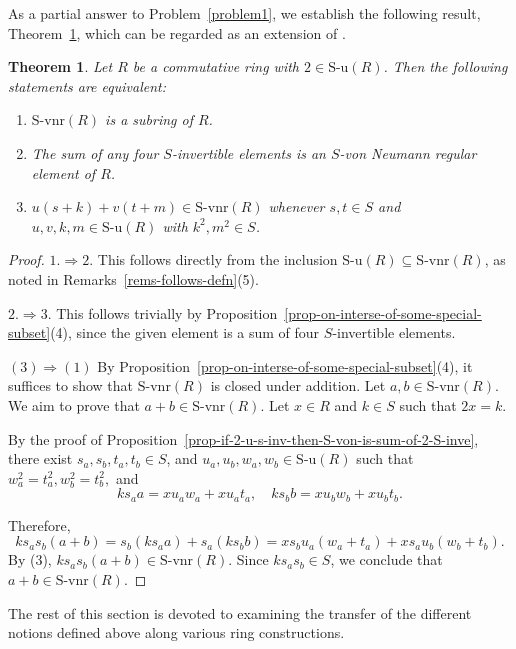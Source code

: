 \documentclass[12pt]{article}
\newtheorem{thm}{\bf Theorem}[section]
\def\Su{\mathrm{S\text{-}u}}
\def\Svnr{\mathrm{S\text{-}vnr}}
\begin{document}
 As a partial answer to Problem~\ref{problem1}, we establish the following result, Theorem~\ref{thm-Svnr(R)-subring}, which can be regarded as an extension of \cite[Theorem~2.11]{And1}.

 
\begin{thm}\label{thm-Svnr(R)-subring}
Let \( R \) be a commutative ring with \( 2 \in \Su(R) \). Then the following statements are equivalent:
\begin{enumerate}
    \item \( \Svnr(R) \) is a subring of \( R \).
    \item The sum of any four \( S \)-invertible elements is an \( S \)-von Neumann regular element of \( R \).
    \item \( u(s + k) + v(t + m) \in \Svnr(R) \) whenever \( s, t \in S \) and \( u, v, k, m \in \Su(R) \) with \( k^2, m^2 \in S \).

\end{enumerate}
\end{thm}

\begin{proof}
\(1.\Rightarrow 2.\) This follows directly from the inclusion \( \Su(R) \subseteq \Svnr(R) \), as noted in Remarks~\ref{rems-follows-defn}(5).

\(2.\Rightarrow 3.\) This follows trivially by Proposition~\ref{prop-on-interse-of-some-special-subset}(4), since the given element is a sum of four \( S \)-invertible elements.

\((3) \Rightarrow (1)\) By Proposition~\ref{prop-on-interse-of-some-special-subset}(4), it suffices to show that \( \Svnr(R) \) is closed under addition. Let \( a, b \in \Svnr(R) \). We aim to prove that \( a + b \in \Svnr(R) \). Let \( x \in R \) and \( k \in S \) such that \( 2x = k \).

By the proof of Proposition~\ref{prop-if-2-u-s-inv-then-S-von-is-sum-of-2-S-inve}, there exist \( s_a, s_b, t_a, t_b \in S \), and \( u_a, u_b, w_a, w_b \in \Su(R) \) such that $ w_a^2= t_a^2,  w_b^2=t_b^2,$ and   
\[
ks_a a = x u_a w_a + x u_a t_a, \quad ks_b b = x u_b w_b + x u_b t_b.
\]

Therefore,
\[
ks_a s_b (a + b) = s_b (ks_a a) + s_a (ks_b b) = x s_b u_a (w_a + t_a) + x s_a u_b (w_b + t_b).
\]
By (3), \(ks_a s_b (a + b) \in  \Svnr(R) \). Since \( ks_a s_b \in S \), we conclude that \( a + b \in \Svnr(R) \). 
\end{proof}



The rest of this section is devoted to examining the transfer of the different notions defined above along various ring constructions.
\end{document}
